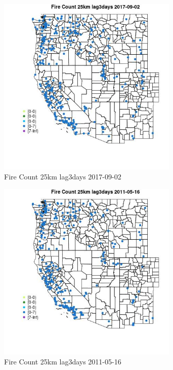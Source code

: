 \begin{figure} 
\centering  
\includegraphics[width=0.77\textwidth]{Code_Outputs/Report_ML_input_PM25_Step4_part_e_de_duplicated_aves_compiled_2019-05-21wNAs_MapObsFire_Count_25km_lag3days2017-09-02.jpg} 
\caption{\label{fig:Report_ML_input_PM25_Step4_part_e_de_duplicated_aves_compiled_2019-05-21wNAsMapObsFire_Count_25km_lag3days2017-09-02}Fire Count 25km lag3days 2017-09-02} 
\end{figure} 
 

\begin{figure} 
\centering  
\includegraphics[width=0.77\textwidth]{Code_Outputs/Report_ML_input_PM25_Step4_part_e_de_duplicated_aves_compiled_2019-05-21wNAs_MapObsFire_Count_25km_lag3days2011-05-16.jpg} 
\caption{\label{fig:Report_ML_input_PM25_Step4_part_e_de_duplicated_aves_compiled_2019-05-21wNAsMapObsFire_Count_25km_lag3days2011-05-16}Fire Count 25km lag3days 2011-05-16} 
\end{figure} 
 

